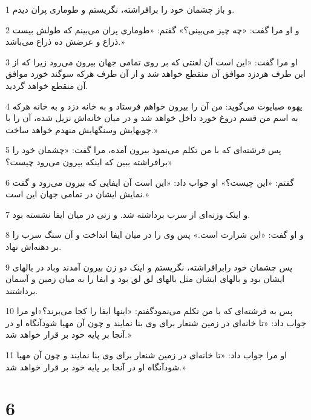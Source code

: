 \par 1 و باز چشمان خود را برافراشته، نگریستم و طوماری پران دیدم.
\par 2 و او مرا گفت: «چه چیز می‌بینی؟» گفتم: «طوماری پران می‌بینم که طولش بیست ذراع و عرضش ده ذراع می‌باشد.»
\par 3 او مرا گفت: «این است آن لعنتی که بر روی تمامی جهان بیرون می‌رود زیرا که از این طرف هردزد موافق آن منقطع خواهد شد و از آن طرف هرکه سوگند خورد موافق آن منقطع خواهد گردید.
\par 4 یهوه صبایوت می‌گوید: من آن را بیرون خواهم فرستاد و به خانه دزد و به خانه هر‌که به اسم من قسم دروغ خورد داخل خواهد شد و در میان خانه‌اش نزیل شده، آن را با چوبهایش وسنگهایش منهدم خواهد ساخت.»
\par 5 پس فرشته‌ای که با من تکلم می‌نمود بیرون آمده، مرا گفت: «چشمان خود را برافراشته ببین که اینکه بیرون می‌رود چیست؟»
\par 6 گفتم: «این چیست؟» او جواب داد: «این است آن ایفایی که بیرون می‌رود و گفت نمایش ایشان در تمامی جهان این است.»
\par 7 و اینک وزنه‌ای از سرب برداشته شد. و زنی در میان ایفا نشسته بود.
\par 8 و او گفت: «این شرارت است.» پس وی را در میان ایفا انداخت و آن سنگ سرب را بر دهنه‌اش نهاد.
\par 9 پس چشمان خود رابرافراشته، نگریستم و اینک دو زن بیرون آمدند وباد در بالهای ایشان بود و بالهای ایشان مثل بالهای لق لق بود و ایفا را به میان زمین و آسمان برداشتند.
\par 10 پس به فرشته‌ای که با من تکلم می‌نمودگفتم: «اینها ایفا را کجا می‌برند؟»او مرا جواب داد: «تا خانه‌ای در زمین شنعار برای وی بنا نمایند و چون آن مهیا شودآنگاه او در آنجا بر پایه خود بر قرار خواهد شد.»
\par 11 او مرا جواب داد: «تا خانه‌ای در زمین شنعار برای وی بنا نمایند و چون آن مهیا شودآنگاه او در آنجا بر پایه خود بر قرار خواهد شد.»

\chapter{6}


